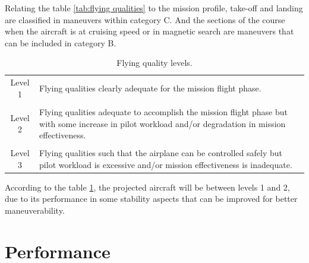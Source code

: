 \documentclass[english,fira]{ist-report}
\begin{document}
Relating the table \ref{tab:flying qualities} to the mission profile, take-off and landing are classified in maneuvers within category C. And the sections of the course when the aircraft is at cruising speed or in magnetic search are maneuvers that can be included in category B.



\begin{table}[ht]
    \centering
    \begin{tabular}{c m{10cm}}\toprule
        Level 1 & Flying qualities clearly adequate for the mission flight phase. \\
        & \\
        Level 2 & Flying qualities adequate to accomplish the mission flight phase but with some increase in pilot workload and/or degradation in mission effectiveness. \\
        & \\
        Level 3 & Flying qualities such that the airplane can be controlled safely but pilot workload is excessive and/or mission effectiveness is inadequate. \\
        \bottomrule
    \end{tabular}
    \caption{Flying quality levels.}
    \label{tab:level flight}
\end{table}

According to the table \ref{tab:level flight}, the projected aircraft will be between levels 1 and 2, due to its performance in some stability aspects that can be improved for better maneuverability.

\chapter{Performance}
\end{document}
